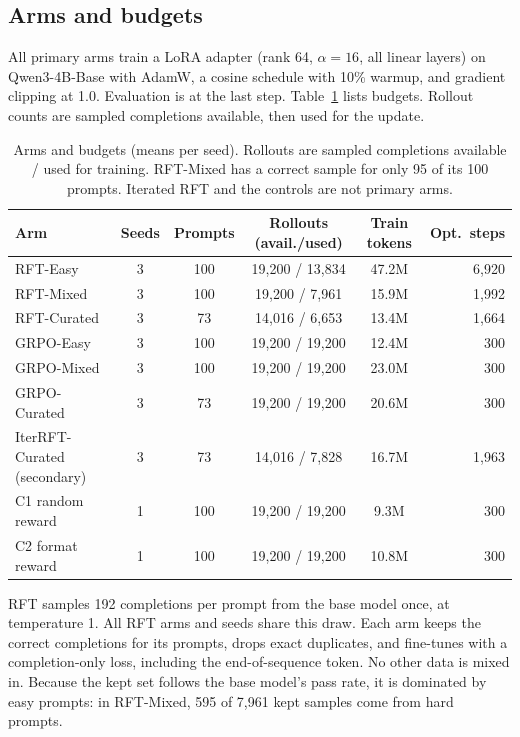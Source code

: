 \subsection{Arms and budgets}
\label{sec:arms}

All primary arms train a LoRA adapter (rank 64, $\alpha{=}16$, all linear layers) on Qwen3-4B-Base with AdamW, a cosine schedule with 10\% warmup, and gradient clipping at 1.0. Evaluation is at the last step. Table~\ref{tab:arms} lists budgets. Rollout counts are sampled completions available, then used for the update.

\begin{table}[t]
\centering
{\small
\begin{tabular}{lccccr}
\toprule
Arm & Seeds & Prompts & Rollouts (avail./used) & Train tokens & Opt.\ steps \\
\midrule
RFT-Easy & 3 & 100 & 19{,}200 / 13{,}834 & 47.2M & 6{,}920 \\
RFT-Mixed & 3 & 100 & 19{,}200 / 7{,}961 & 15.9M & 1{,}992 \\
RFT-Curated & 3 & 73 & 14{,}016 / 6{,}653 & 13.4M & 1{,}664 \\
GRPO-Easy & 3 & 100 & 19{,}200 / 19{,}200 & 12.4M & 300 \\
GRPO-Mixed & 3 & 100 & 19{,}200 / 19{,}200 & 23.0M & 300 \\
GRPO-Curated & 3 & 73 & 19{,}200 / 19{,}200 & 20.6M & 300 \\
\midrule
IterRFT-Curated (secondary) & 3 & 73 & 14{,}016 / 7{,}828 & 16.7M & 1{,}963 \\
C1 random reward & 1 & 100 & 19{,}200 / 19{,}200 & 9.3M & 300 \\
C2 format reward & 1 & 100 & 19{,}200 / 19{,}200 & 10.8M & 300 \\
\bottomrule
\end{tabular}
}
\caption{Arms and budgets (means per seed). Rollouts are sampled completions available / used for training. RFT-Mixed has a correct sample for only 95 of its 100 prompts. Iterated RFT and the controls are not primary arms.}
\label{tab:arms}
\end{table}

RFT samples 192 completions per prompt from the base model once, at temperature 1. All RFT arms and seeds share this draw. Each arm keeps the correct completions for its prompts, drops exact duplicates, and fine-tunes with a completion-only loss, including the end-of-sequence token. No other data is mixed in. Because the kept set follows the base model's pass rate, it is dominated by easy prompts: in RFT-Mixed, 595 of 7{,}961 kept samples come from hard prompts.

